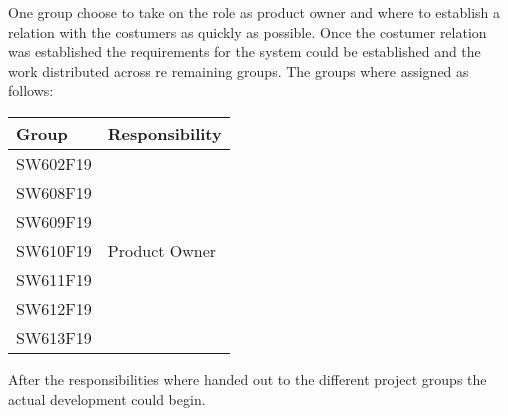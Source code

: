 One group choose to take on the role as product owner and where to establish a relation with the costumers as quickly as possible. 
Once the costumer relation was established the requirements for the system could be established and the work distributed across re remaining groups.
The groups where assigned as follows:
\begin{table}[H]
\centering
\begin{tabular}{|l|l|}
\hline
\textbf{Group} & \textbf{Responsibility} \\ \hline
SW602F19 & \\ \hline
SW608F19 &           \\ \hline
SW609F19 &           \\ \hline
SW610F19 & Product Owner  \\ \hline
SW611F19 &           \\ \hline
SW612F19 &           \\ \hline
SW613F19 & \\ \hline
\end{tabular}
\end{table}

After the responsibilities where handed out to the different project groups the actual development could begin.

